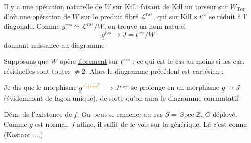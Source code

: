 Il y a une opération naturelle de $W$ sur $\mathrm{Kill}$, faisant de $\mathrm{Kill}$ un torseur sur $W_{\mathrm{Tor}}$, d'où une opération de $W$ sur le produit fibré $\underline{\mathscr L}^{rss}$, qui sur $\mathrm{Kill}\times\underline t^{rs}$ se réduit à l' \uline{diagonale}. Comme $\underline g^{rss}\simeq\mathscr L^{rss}/W$, on trouve un hom naturel
\[
\underline g^{rss}\longrightarrow J=\underline t^{rss}/W
\]
donnant naissance au diagramme

Supposons que $W$ opère \uline{librement} sur $\underline t^{rss}$ ;  ce qui est le cas au moins si les car. résiduelles sont toutes $\ne 2$. Alors le diagramme précédent est cartésien ; 

Je dis que le morphisme $\underline g^{\unsure{rs|rss}}\longrightarrow J^{rss}$ se prolonge en un morphisme $\underline g\longrightarrow J$ (évidemment de façon unique), de sorte qu'on aura le diagramme commutatif

Dém. de l'existence de $f$. On peut se ramener au cas $S=\operatorname{Spec}\mathbb Z$, $G$ déployé.  Comme $\underline g$ est normal, $J$ affine, il suffit de le voir sur la  générique. Là c'est connu (Kostant ....)

